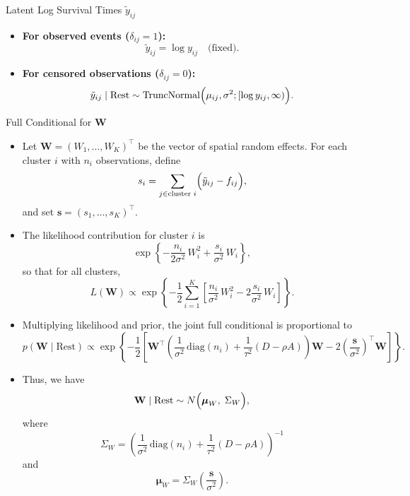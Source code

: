 \begin{frame}{Latent Log Survival Times \(\tilde{y}_{ij}\)}
  \begin{itemize}
    \item \textbf{For observed events (\(\delta_{ij}=1\)):} 
      \[
      \tilde{y}_{ij} = \log y_{ij}\quad \text{(fixed).}
      \]
    \item \textbf{For censored observations (\(\delta_{ij}=0\)):}
      \[
      \tilde{y}_{ij}\mid \text{Rest} \sim \operatorname{TruncNormal}\Bigl(\mu_{ij},\sigma^2;[\log y_{ij},\infty)\Bigr).
      \]
  \end{itemize}
\end{frame}

\begin{frame}{Full Conditional for \(\mathbf{W}\)}
  \begin{itemize}
    \item Let \(\mathbf{W}=(W_1,\ldots,W_K)^\top\) be the vector of spatial random effects. For each cluster \(i\) with \(n_i\) observations, define
      \[
      s_i = \sum_{j\in \text{cluster } i} \Bigl(\tilde{y}_{ij} - f_{ij}\Bigr),
      \]
      and set \(\mathbf{s}=(s_1,\ldots,s_K)^\top\).
    \item The likelihood contribution for cluster \(i\) is
      \[
      \exp\!\left\{-\frac{n_i}{2\sigma^2}\,W_i^2 + \frac{s_i}{\sigma^2}\,W_i\right\},
      \]
      so that for all clusters,
      \[
      L(\mathbf{W}) \propto \exp\!\left\{-\frac{1}{2}\sum_{i=1}^K \left[\frac{n_i}{\sigma^2}\,W_i^2 - 2\frac{s_i}{\sigma^2}\,W_i\right]\right\}.
      \]
    \end{itemize}
    \end{frame}

      \begin{frame}
        
    \begin{itemize}
      
   
      \item Multiplying likelihood and prior, the joint full conditional is proportional to
      \[
      p(\mathbf{W}\mid \text{Rest}) \propto \exp\!\left\{-\frac{1}{2}\left[ \mathbf{W}^\top \left(\frac{1}{\sigma^2}\,\mathrm{diag}(n_i) + \frac{1}{\tau^2}(D-\rho A)\right)\mathbf{W} - 2 \left(\frac{\mathbf{s}}{\sigma^2}\right)^\top \mathbf{W} \right] \right\}.
      \]
    \item Thus, we have
      \[
      \mathbf{W}\mid \text{Rest} \sim N\Bigl(\boldsymbol{\mu}_W,\; \Sigma_W\Bigr),
      \]
      where
      \[
      \Sigma_W = \left(\frac{1}{\sigma^2}\,\mathrm{diag}(n_i) + \frac{1}{\tau^2}(D-\rho A)\right)^{-1}
      \]
      and
      \[
      \boldsymbol{\mu}_W = \Sigma_W \left(\frac{\mathbf{s}}{\sigma^2}\right).
      \]
  \end{itemize}
\end{frame}

